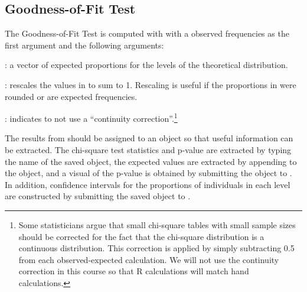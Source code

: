 \documentclass[10pt,openany]{book}\usepackage[]{graphicx}\usepackage[]{color}
\begin{document}


\subsection{Goodness-of-Fit Test}
The Goodness-of-Fit Test is computed with  with a observed frequencies as the first argument and the following arguments:
\begin{Itemize}
  \item {}: a vector of expected proportions for the levels of the theoretical distribution.
  \item {}: rescales the values in  to sum to 1. Rescaling is useful if the proportions in  were rounded or are expected frequencies.
  \item {}: indicates to not use a ``continuity correction''.\footnote{Some statisticians argue that small chi-square tables with small sample sizes should be corrected for the fact that the chi-square distribution is a continuous distribution. This correction is applied by simply subtracting 0.5 from each observed-expected calculation. We will not use the continuity correction in this course so that R calculations will match hand calculations.}
\end{Itemize}

The results from  should be assigned to an object so that useful information can be extracted. The chi-square test statistics and p-value are extracted by typing the name of the saved object, the expected values are extracted by appending  to the object, and a visual of the p-value is obtained by submitting the object to . In addition, confidence intervals for the proportions of individuals in each level are constructed by submitting the saved object to .

\end{document}

